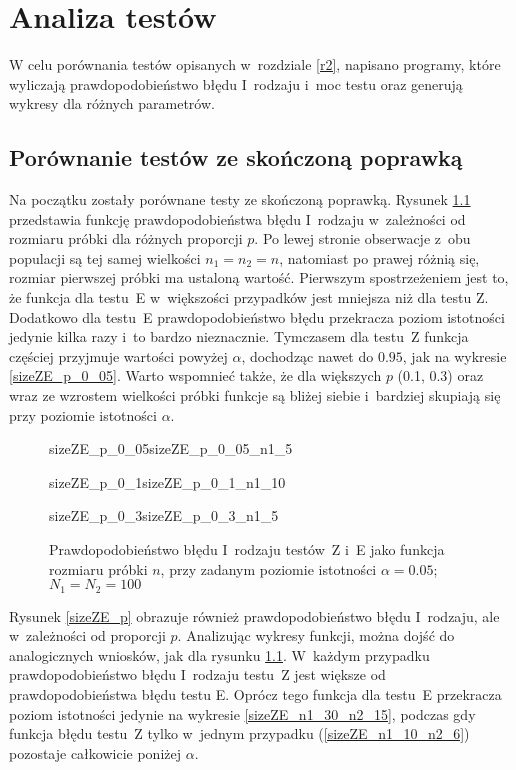 \chapter{Analiza testów}
\label{r3}

W celu porównania testów opisanych w~rozdziale \ref{r2}, napisano programy, które wyliczają prawdopodobieństwo błędu I~rodzaju i~moc testu oraz generują wykresy dla różnych parametrów.

\section{Porównanie testów ze skończoną poprawką}
Na początku zostały porównane testy ze skończoną poprawką. Rysunek \ref{sizeZE_n} przedstawia funkcję prawdopodobieństwa błędu I~rodzaju w~zależności od rozmiaru próbki dla różnych proporcji $p$. Po lewej stronie obserwacje z~obu populacji są tej samej wielkości $n_1=n_2=n$, natomiast po prawej różnią się, rozmiar pierwszej próbki ma ustaloną wartość. Pierwszym spostrzeżeniem jest to, że funkcja dla testu~E w~większości przypadków jest mniejsza niż dla testu Z. Dodatkowo dla testu~E prawdopodobieństwo błędu przekracza poziom istotności jedynie kilka razy i~to bardzo nieznacznie. Tymczasem dla testu~Z funkcja częściej przyjmuje wartości powyżej $\alpha$, dochodząc nawet do $0.95$, jak na wykresie \ref{sizeZE_p_0_05}. Warto wspomnieć także, że dla większych $p$ (0.1, 0.3) oraz wraz ze wzrostem wielkości próbki funkcje są bliżej siebie i~bardziej skupiają się przy poziomie istotności $\alpha$.

\begin{figure}[!h]
	\begin{subdiagrams}{sizeZE_p_0_05}{sizeZE_p_0_05_n1_5}
	\end{subdiagrams}
	
	\begin{subdiagrams}{sizeZE_p_0_1}{sizeZE_p_0_1_n1_10}
	\end{subdiagrams}
	
	\begin{subdiagrams}{sizeZE_p_0_3}{sizeZE_p_0_3_n1_5}
	\end{subdiagrams}
	\caption{Prawdopodobieństwo błędu I~rodzaju testów~Z i~E jako funkcja rozmiaru próbki $n$, przy zadanym poziomie istotności $\alpha=0.05$; $N_1=N_2=100$}
	\label{sizeZE_n}
\end{figure}

Rysunek \ref{sizeZE_p} obrazuje również prawdopodobieństwo błędu I~rodzaju, ale w~zależności od proporcji $p$. Analizując wykresy funkcji, można dojść do analogicznych wniosków, jak dla rysunku \ref{sizeZE_n}. W~każdym przypadku prawdopodobieństwo błędu I~rodzaju testu~Z jest większe od prawdopodobieństwa błędu testu E. Oprócz tego funkcja dla testu~E przekracza poziom istotności jedynie na wykresie \ref{sizeZE_n1_30_n2_15}, podczas gdy funkcja błędu testu~Z tylko w~jednym przypadku (\ref{sizeZE_n1_10_n2_6}) pozostaje całkowicie poniżej $\alpha$.

